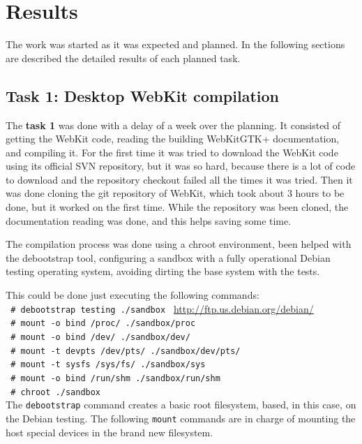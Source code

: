 \documentclass[a4paper,11pt,openany]{report}
\begin{document}
\chapter{Results}
The work was started as it was expected and planned. In the following sections are described the detailed results of each planned task.

\section{Task 1: Desktop WebKit compilation}
The \textbf{task 1} was done with a delay of a week over the planning. It consisted of getting the WebKit code, reading the building WebKitGTK+\cite{build webkitgtk+} documentation, and compiling it.
For the first time it was tried to download the WebKit code using its official SVN repository, but it was so hard, because there is a lot of code to download and the repository checkout failed all the times it was tried. Then it was done cloning the git repository of WebKit\cite{git webkit}, which took about 3 hours to be done, but it worked on the first time.
While the repository was been cloned, the documentation reading was done, and this helps saving some time.

The compilation process was done using a chroot\cite{chroot} environment, been helped with the debootstrap\cite{debootstrap} tool, configuring a sandbox with a fully operational Debian testing operating system, avoiding dirting the base system with the tests.

This could be done just executing the following commands:\\
\verb$ # debootstrap testing ./sandbox $ \url{http://ftp.us.debian.org/debian/}\\
\verb$ # mount -o bind /proc/ ./sandbox/proc $\\
\verb$ # mount -o bind /dev/ ./sandbox/dev/ $\\
\verb$ # mount -t devpts /dev/pts/ ./sandbox/dev/pts/ $\\
\verb$ # mount -t sysfs /sys/fs/ ./sandbox/sys $\\
\verb$ # mount -o bind /run/shm ./sandbox/run/shm $\\
\verb$ # chroot ./sandbox $\\

The \verb#debootstrap# command creates a basic root filesystem, based, in this case, on the Debian testing. The following \verb#mount# commands are in charge of mounting the host special devices in the brand new filesystem.
\end{document}
